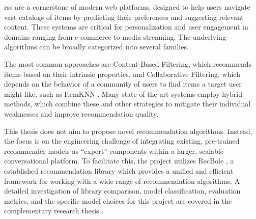 \acl{rs}s are a cornerstone of modern web platforms, designed to help users navigate vast catalogs of items by predicting their preferences and suggesting relevant content. These systems are critical for personalization and user engagement in domains ranging from e-commerce to media streaming. The underlying algorithms can be broadly categorized into several families.

The most common approaches are Content-Based Filtering, which recommends items based on their intrinsic properties, and Collaborative Filtering, which depends on the behavior of a community of users to find items a target user might like, such as ItemKNN \cite{ITEMKNN}. Many state-of-the-art systems employ hybrid methods, which combine these and other strategies to mitigate their individual weaknesses and improve recommendation quality.

This thesis does not aim to propose novel recommendation algorithms. Instead, the focus is on the engineering challenge of integrating existing, pre-trained recommender models as ``expert'' components within a larger, scalable conversational platform. To facilitate this, the project utilizes RecBole \cite{RECBOLE}, a established recommendation library which provides a unified and efficient framework for working with a wide range of recommendation algorithms. A detailed investigation of library comparison, model classification, evaluation metrics, and the specific model choices for this project are covered in the complementary research thesis \cite{MUI2ICSI:SOTA}.